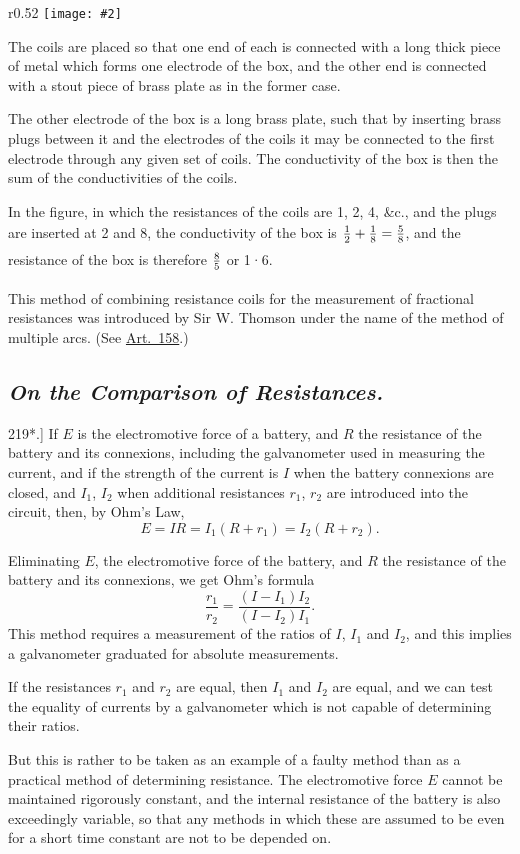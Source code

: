 \documentclass[12pt,oneside]{book}[2021/10/04]
\newcommand{\Heading}{\centering\normalfont}
\newcommand{\Subsection}[1]{\subsection*{\normalsize\Heading\itshape #1}}
\newcommand{\Runhead}[1]{\fancyhead[C]{\iffloatpage{}{\small#1}}}
\newcommand{\article}[1]{\phantomsection \label{art:#1}{#1.]}}
\newcommand{\tstrut}{\rule[-1.5ex]{0pt}{4.2ex}}
\newcommand{\wrapfig}[3]{
\begin{wrapfigure}{r}{#1\textwidth}
\centering
\texttt{[image: \#2]}
\caption*{\small #3}
\end{wrapfigure}}
\newcommand{\¬}{\hphantom{0}}
\begin{document}
\wrapfig{0.52}{199.png}{Fig. 46.}
The coils are placed so that
one end of each is connected
with a long thick piece of
metal which forms one electrode
of the box, and the other
end is connected with a stout piece of brass plate as in the former
case.

The other electrode of the box is a long brass plate, such that
by inserting brass plugs between it and the electrodes of the coils
it may be connected to the first electrode through any given set of
coils. The conductivity of the box is then the sum of the conductivities
of the coils.

In the figure, in which the resistances of the coils are 1, 2, 4, \&c.,
and the plugs are inserted at 2 and 8, the conductivity of the box
is \(\tstrut\frac{1}{2} + \tstrut\frac{1}{8} = \tstrut\frac{5}{8}\), and the resistance of the box is therefore \(\tstrut\frac{8}{5}\) or 1·6.

This method of combining resistance coils for the measurement
of fractional resistances was introduced by Sir W. Thomson under
the name of the method of multiple arcs. (See \hyperref[art:158*]{Art.\ 158}.)

\Subsection{On the Comparison of Resistances.}

\article{219*} If \(E\) is the electromotive force of a battery, and \(R\) the
resistance of the battery and its connexions, including the galvanometer
used in measuring the current, and if the strength of the
current is \(I\) when the battery connexions are closed, and \(I_1\), \(I_2\)
when additional resistances \(r_1\), \(r_2\) are introduced into the circuit,
then, by Ohm's Law,
\Runhead{THE COMPARISON OF RESISTANCES.}
\[E = IR = I_1( R + r_1 ) = I_2( R + r_2 )\text{.}\]

Eliminating \(E\), the electromotive force of the battery, and \(R\)
the resistance of the battery and its connexions, we get Ohm's
formula
\[
\frac{r_1}{r_2} = \frac{(I-I_1)I_2}{(I-I_2)I_1}\text{.}
\]
This method requires a measurement of the ratios of \(I\), \(I_1\) and \(I_2\),
and this implies a galvanometer graduated for absolute measurements.

If the resistances \(r_1\) and \(r_2\) are equal, then \(I_1\) and \(I_2\) are equal,
and we can test the equality of currents by a galvanometer which
is not capable of determining their ratios.

But this is rather to be taken as an example of a faulty method
than as a practical method of determining resistance. The electromotive
force \(E\) cannot be maintained rigorously constant, and the
internal resistance of the battery is also exceedingly variable, so
that any methods in which these are assumed to be even for a short
time constant are not to be depended on.
\end{document}
